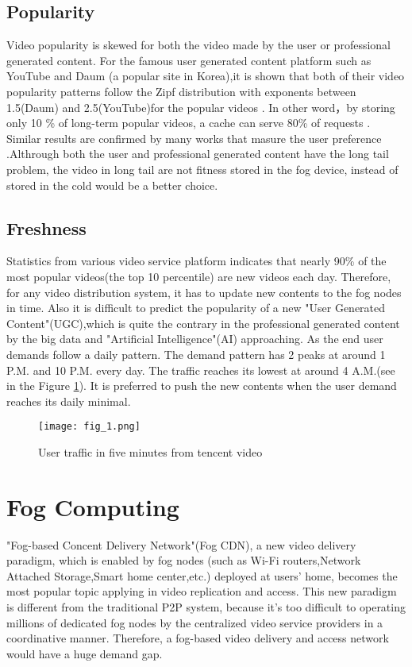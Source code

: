 \subsection{Popularity}
Video popularity is skewed for both the video made by the user or professional generated content. For
the famous user generated content platform such as 	YouTube and Daum (a popular site in Korea),it is
shown that both of their video popularity patterns follow the Zipf distribution with exponents between
1.5(Daum) and 2.5(YouTube)for the popular videos \citep{Cha2009Analyzing}. In other word，by storing only 10 \% of long-term
popular videos, a cache can serve 80\% of requests \citep{Chen2017Migrating}.	Similar results are
confirmed by many works that masure the user preference \citep{edgecomputing} \citep{Chen2015Thunder} \citep{Huang2007Can}
 \citep{Ma2016Understanding}.Althrough both the user and professional generated content have the long
tail problem, the video in long tail are not fitness stored in the fog device, instead of stored in
the cold would be a better choice.

 \subsection{Freshness}
Statistics from various video service platform indicates that nearly 90\% of the most popular
videos(the top 10 percentile) are new videos each day. Therefore, for any video distribution system,
it has to update new contents to the fog nodes in time. Also it is  difficult to predict the popularity
of a new "User Generated Content"(UGC),which is quite the contrary in the professional generated content
by the big data and "Artificial Intelligence"(AI) approaching. As the end user demands follow a daily
pattern. The demand pattern has 2 peaks at around 1 P.M. and 10 P.M. every day. The traffic reaches its
lowest at around 4 A.M.(see in the Figure \ref{fig_1}). It is preferred to push the new contents when the user demand reaches its daily
minimal.
\begin{figure}[htbp]
\centering
	\vskip 1.0cm
	  \texttt{[image: fig\_1.png]}
\caption{User traffic in five minutes from tencent video}
 \label{fig_1}
\end{figure}

\section{Fog Computing}
"Fog-based Concent Delivery Network"(Fog CDN), a new video delivery paradigm, which is enabled by fog nodes
(such as Wi-Fi routers,Network Attached Storage,Smart home center,etc.) deployed at users' home, becomes
the most popular topic applying in video replication and access. This  new paradigm is different from
the traditional P2P system, because it's too difficult to operating millions of dedicated
fog nodes  by the centralized video service providers in a coordinative manner\citep{Ma2016Understanding}.
Therefore, a fog-based video delivery and access network would have a huge demand gap.
